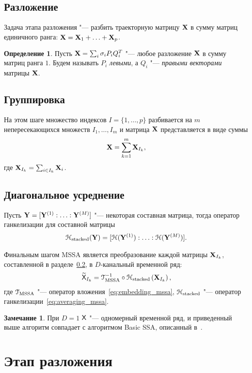 \documentclass[specialist,
substylefile = spbu_report.rtx,
subf,href,colorlinks=true, 12pt]{disser}
\theoremstyle{definition}
\newtheorem{definition}{Определение}
\newtheorem{remark}{Замечание}
\begin{document}
\subsection{Разложение}
Задача этапа разложения "--- разбить траекторную матрицу $\mathbf{X}$ в сумму матриц единичного ранга: $\mathbf{X}=\mathbf{X}_1+\ldots+\mathbf{X}_p$.
\begin{definition}
	Пусть $\mathbf{X}=\sum_i \sigma_i P_i Q_i^T$ "--- любое разложение $\mathbf{X}$ в сумму матриц ранга $1$. Будем называть $P_i$ \emph{левыми}, а $Q_i$ "--- \emph{правыми векторами} матрицы $\mathbf{X}$.
\end{definition}

\subsection{Группировка}\label{sect:grouping}
На этом шаге множество индексов $I=\{1,\ldots,p\}$ разбивается на $m$ непересекающихся множеств $I_1,\ldots,I_m$ и матрица $\mathbf{X}$ представляется в виде суммы
\[
	\mathbf{X} = \sum_{k=1}^m \mathbf{X}_{I_k},
\]
где $\mathbf{X}_{I_k}=\sum_{i\in I_k}\mathbf{X}_i$.

\subsection{Диагональное усреднение}\label{sect:averaging}
Пусть $\mathbf{Y}=[\mathbf{Y}^{(1)}:\ldots:\mathbf{Y}^{(M)}]$ "--- некоторая составная матрица, тогда оператор ганкелизации для составной матрицы
\begin{equation}\label{eq:averaging_mssa}
\EuScript{H}_{\text{stacked}}(\mathbf{Y})=[\EuScript{H}(\mathbf{Y}^{(1)}):\ldots:\EuScript{H}(\mathbf{Y}^{(M)})].
\end{equation}

Финальным шагом MSSA является преобразование каждой матрицы $\mathbf{X}_{I_k}$, составленной в разделе~\ref{sect:grouping}, в $D$-канальный временной ряд:
\begin{equation}
	\widetilde{\mathsf{X}}_{I_k}=\EuScript{T}_{\text{MSSA}}^{-1}\circ\EuScript{H}_{\text{stacked}}\left(\mathbf{X}_{I_k}\right),
\end{equation}
где $\EuScript{T}_{\text{MSSA}}$ "--- оператор вложения~\eqref{eq:embedding_mssa}, $\EuScript{H}_{\text{stacked}}$ "--- оператор ганкелизации~\eqref{eq:averaging_mssa}.
\begin{remark}
При $D=1$ $\mathsf{X}$ "--- одномерный временной ряд, и приведенный выше алгоритм совпадает с алгоритмом Basic SSA, описанный в~\cite{ssa_an}.
\end{remark}

\section{Этап разложения}\label{sect:decomposition}
\end{document}
